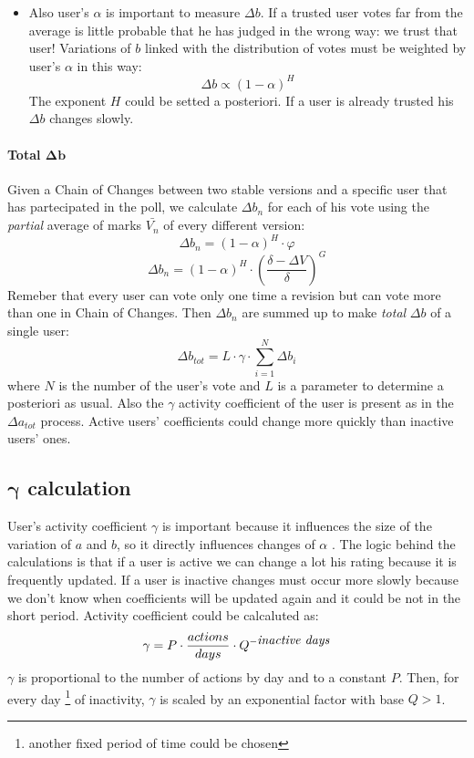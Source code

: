 \documentclass[a4paper,11pt]{article}
\newcommand{\al}{$\alpha$ }
\begin{document}
\begin{itemize}
\item Also user's \al is important to measure $\Delta b$. If a trusted user votes far from the average is little probable that he has judged in the wrong way: we trust that user! Variations of $b$ linked with the distribution of votes must be weighted by user's \al in this way:
\begin{equation}
\Delta b \propto \left(1- \alpha\right)^H
\end{equation}
The exponent $H$ could be setted a posteriori. If a user is already trusted his $\Delta b$ changes slowly. 
\end{itemize}

\paragraph{Total $\mathbf{\Delta b}$}
Given a Chain of Changes between two stable versions and a specific user that has partecipated  in the poll, we calculate $\Delta b_n$ for each of his vote using the \emph{partial} average of marks $\bar{V_n}$ of every different version:
\begin{equation}
\Delta b_n =  \left(1- \alpha\right)^H \cdot \varphi
\end{equation}
\begin{equation}
\Delta b_n = \left(1- \alpha\right)^H \cdot \left(\frac{\delta - \Delta V}{\delta}\right)^G
\end{equation}
Remeber that every user can vote only one time a revision but can vote more than one in Chain of Changes.
Then $\Delta b_n$ are summed up to make \emph{total} $\Delta b$ of a single user:
\begin{equation}
\Delta b_{tot} = L \cdot \gamma \cdot \sum_{i=1}^N \Delta b_i
\end{equation}
where $N$ is the number of the user's vote and $L$ is a parameter to determine a posteriori as usual. Also the $\gamma$ activity coefficient of the user is present as in the $\Delta a_{tot}$ process. Active users' coefficients could change more quickly than inactive users' ones.

\subsection{$\boldsymbol{\gamma}$ calculation} \label{sec:gamma}
User's activity coefficient $\gamma$ is important because it influences the size of the variation of $a$ and $b$, so it directly influences changes of \al.
The logic behind the calculations is that if a user is active we can change a lot his rating because it is frequently updated. If a user is inactive changes must occur more slowly because we don't know when coefficients will be updated again and it could be not in the short period.
Activity coefficient could be calcaluted as:
\begin{equation}
\gamma =  P \cdot \frac{actions}{days} \cdot Q^{-\mbox{\textit{inactive days}}}
\end{equation}
$\gamma$ is proportional to the number of actions by day and to a constant $P$.
Then, for every day \footnote{another fixed period of time could be chosen} of inactivity, $\gamma$ is scaled by an exponential factor with base $Q > 1$.
\end{document}
